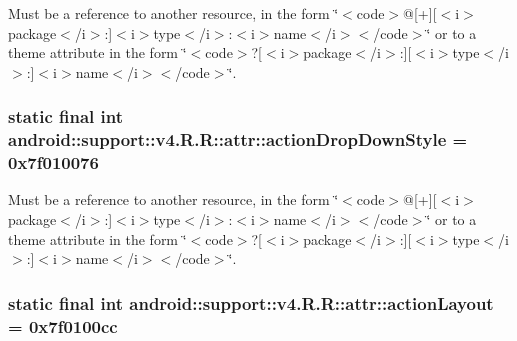 Must be a reference to another resource, in the form \char`\"{}$<$code$>$@\mbox{[}+\mbox{]}\mbox{[}$<$i$>$package$<$/i$>$:\mbox{]}$<$i$>$type$<$/i$>$:$<$i$>$name$<$/i$>$$<$/code$>$\char`\"{} or to a theme attribute in the form \char`\"{}$<$code$>$?\mbox{[}$<$i$>$package$<$/i$>$:\mbox{]}\mbox{[}$<$i$>$type$<$/i$>$:\mbox{]}$<$i$>$name$<$/i$>$$<$/code$>$\char`\"{}. \hypertarget{classandroid_1_1support_1_1v4_1_1_r_1_1attr_370e3423233a4e58c6f52c9932793e14}{
\subsubsection[{actionDropDownStyle}]{\setlength{\rightskip}{0pt plus 5cm}static final int android::support::v4.R.R::attr::actionDropDownStyle = 0x7f010076}}
\label{classandroid_1_1support_1_1v4_1_1_r_1_1attr_370e3423233a4e58c6f52c9932793e14}


Must be a reference to another resource, in the form \char`\"{}$<$code$>$@\mbox{[}+\mbox{]}\mbox{[}$<$i$>$package$<$/i$>$:\mbox{]}$<$i$>$type$<$/i$>$:$<$i$>$name$<$/i$>$$<$/code$>$\char`\"{} or to a theme attribute in the form \char`\"{}$<$code$>$?\mbox{[}$<$i$>$package$<$/i$>$:\mbox{]}\mbox{[}$<$i$>$type$<$/i$>$:\mbox{]}$<$i$>$name$<$/i$>$$<$/code$>$\char`\"{}. \hypertarget{classandroid_1_1support_1_1v4_1_1_r_1_1attr_ec38bd01510dcdeac9d0e254f0b6341f}{
\subsubsection[{actionLayout}]{\setlength{\rightskip}{0pt plus 5cm}static final int android::support::v4.R.R::attr::actionLayout = 0x7f0100cc}}
\label{classandroid_1_1support_1_1v4_1_1_r_1_1attr_ec38bd01510dcdeac9d0e254f0b6341f}


